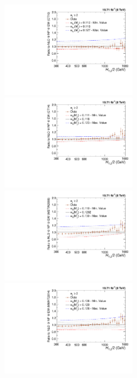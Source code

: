 \begin{figure}[!htbp]
 \begin{center}
 \hspace*{-5mm}\includegraphics[width=0.51\textwidth]{Plots_HT_2_150/Sensitivity_2_ratio_NLO_CT10_EW.pdf}%
 ~~\includegraphics[width=0.51\textwidth]{Plots_HT_2_150/Sensitivity_2_ratio_NLO_CT14_EW.pdf}\\
 \vspace*{3mm}
 \hspace*{-5mm}\includegraphics[width=0.51\textwidth]{Plots_HT_2_150/Sensitivity_2_ratio_NLO_MSTW2008_EW.pdf}%
 ~~\includegraphics[width=0.51\textwidth]{Plots_HT_2_150/Sensitivity_2_ratio_NLO_MMHT2014_EW.pdf}\\

\end{center}
\end{figure}
